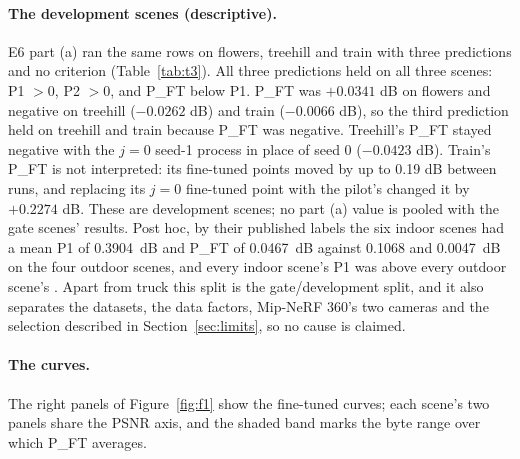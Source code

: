 \paragraph{The development scenes (descriptive).}
E6 part (a) ran the same rows on flowers, treehill and train with three predictions and no criterion (Table~\ref{tab:t3}). %
All three predictions held on all three scenes: P1 $> 0$, P2 $> 0$, and P\_FT below P1. %
P\_FT was $+0.0341$ dB on flowers and negative on treehill ($-0.0262$ dB) and train ($-0.0066$ dB), so the third prediction held on treehill and train because P\_FT was negative. %
Treehill's P\_FT stayed negative with the $j = 0$ seed-1 process in place of seed 0 ($-0.0423$ dB). %
Train's P\_FT is not interpreted: its fine-tuned points moved by up to 0.19 dB between runs, and replacing its $j = 0$ fine-tuned point with the pilot's changed it by $+0.2274$ dB. %
These are development scenes; no part (a) value is pooled with the gate scenes' results. %
Post hoc, by their published labels the six indoor scenes had a mean P1 of 0.3904~dB and P\_FT of 0.0467~dB against 0.1068 and 0.0047~dB on the four outdoor scenes, and every indoor scene's P1 was above every outdoor scene's \citep{barron2022mipnerf360,hedman2016scalable,hanson2025speedy}. %
Apart from truck this split is the gate/development split, and it also separates the datasets, the data factors, Mip-NeRF 360's two cameras and the selection described in Section~\ref{sec:limits}, so no cause is claimed. %

\begin{table}[t]
\centering
\small
\caption{E6 part (a) on the development scenes (BD-PSNR, dB). Descriptive: three predictions checked, no criterion. Generated from the committed bundles.}
\label{tab:t3}

\end{table}

\paragraph{The curves.}
The right panels of Figure~\ref{fig:f1} show the fine-tuned curves; each scene's two panels share the PSNR axis, and the shaded band marks the byte range over which P\_FT averages. %








